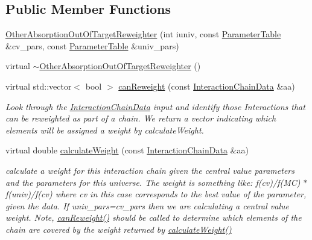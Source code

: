 \subsection*{Public Member Functions}
\begin{DoxyCompactItemize}
\item 
\hyperlink{class_neutrino_flux_reweight_1_1_other_absorption_out_of_target_reweighter_affb154de07dd600158d0d7c0073ae9bb}{Other\-Absorption\-Out\-Of\-Target\-Reweighter} (int iuniv, const \hyperlink{class_neutrino_flux_reweight_1_1_parameter_table}{Parameter\-Table} \&cv\-\_\-pars, const \hyperlink{class_neutrino_flux_reweight_1_1_parameter_table}{Parameter\-Table} \&univ\-\_\-pars)
\item 
virtual \hyperlink{class_neutrino_flux_reweight_1_1_other_absorption_out_of_target_reweighter_a8830b6eb33389a9007b7b8b81f373f00}{$\sim$\-Other\-Absorption\-Out\-Of\-Target\-Reweighter} ()
\item 
virtual std\-::vector$<$ bool $>$ \hyperlink{class_neutrino_flux_reweight_1_1_other_absorption_out_of_target_reweighter_a5ab6da4e6a66b3ec9bcd24ddb4b90cb1}{can\-Reweight} (const \hyperlink{class_neutrino_flux_reweight_1_1_interaction_chain_data}{Interaction\-Chain\-Data} \&aa)
\begin{DoxyCompactList}\small\item\em Look through the \hyperlink{class_neutrino_flux_reweight_1_1_interaction_chain_data}{Interaction\-Chain\-Data} input and identify those Interactions that can be reweighted as part of a chain. We return a vector indicating which elements will be assigned a weight by calculate\-Weight. \end{DoxyCompactList}\item 
virtual double \hyperlink{class_neutrino_flux_reweight_1_1_other_absorption_out_of_target_reweighter_abebfe35083e25e8bca9eb0bf991d74d9}{calculate\-Weight} (const \hyperlink{class_neutrino_flux_reweight_1_1_interaction_chain_data}{Interaction\-Chain\-Data} \&aa)
\begin{DoxyCompactList}\small\item\em calculate a weight for this interaction chain given the central value parameters and the parameters for this universe. The weight is something like\-: f(cv)/f(M\-C) $\ast$ f(univ)/f(cv) where cv in this case corresponds to the best value of the parameter, given the data. If univ\-\_\-pars=cv\-\_\-pars then we are calculating a central value weight. Note, \hyperlink{class_neutrino_flux_reweight_1_1_other_absorption_out_of_target_reweighter_a5ab6da4e6a66b3ec9bcd24ddb4b90cb1}{can\-Reweight()} should be called to determine which elements of the chain are covered by the weight returned by \hyperlink{class_neutrino_flux_reweight_1_1_other_absorption_out_of_target_reweighter_abebfe35083e25e8bca9eb0bf991d74d9}{calculate\-Weight()} \end{DoxyCompactList}\end{DoxyCompactItemize}
